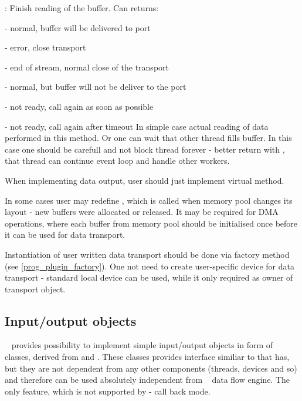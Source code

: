 \item [\func{Read\_Complete()}] :
   Finish reading of the buffer. Can returns:  
   \bdes
   \item[\keyw{dabc::di\_Ok}]           - normal, buffer will be delivered to port
   \item[\keyw{dabc::di\_Error}]        - error, close transport
   \item[\keyw{dabc::di\_EndOfStream}]  - end of stream, normal close of the transport
   \item[\keyw{dabc::di\_SkipBuffer}]   - normal, but buffer will not be deliver to the port
   \item[\keyw{dabc::di\_Repeat}]       - not ready, call again as soon as possible
   \item[\keyw{dabc::di\_RepeatTimeout}] - not ready, call again after timeout
   \edes
   In simple case actual reading of data performed in this method.
   Or one can wait that other thread fills buffer. 
   In this case one should be carefull and not block thread forever - 
   better return with , that thread can continue event loop and 
   handle other workers.  
\ebul

When implementing data output, user should just implement  virtual method.  

In some cases user may redefine , which is called when
memory pool changes its layout - new buffers were allocated or released. 
It may be required for DMA operations, where each buffer from memory pool
should be initialised once before it can be used for data transport.   

Instantiation of user written data transport should be done via factory method
 (see \ref{prog_plugin_factory}). 
One not need to create user-specific device for data transport - 
standard local device can be used, while it only required as owner of transport object. 


\subsection{Input/output objects}

\dabc~ provides possibility to implement simple input/output objects in form
of classes, derived from  and .
These classes provides interface similiar to that  has,
but they are not dependent from any other components (threads, devices and so) 
and therefore can be used absolutely independent from \dabc~ data flow engine.
The only feature, which is not supported by  - call back 
mode.

